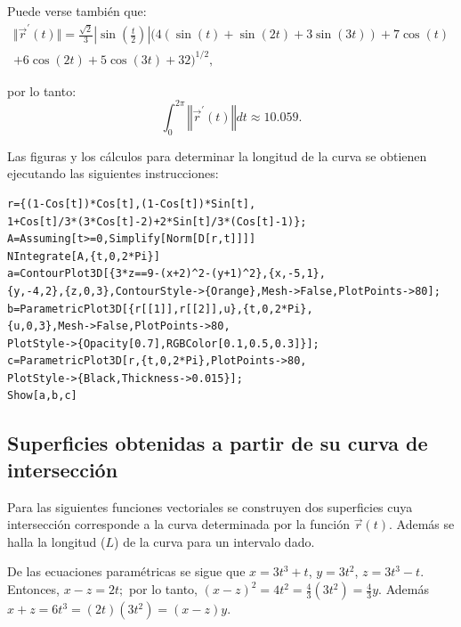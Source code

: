 Puede verse también que:
\begin{multline*}
\Vert \overrightarrow{r}^\prime(t)\Vert= \frac{\sqrt{2}}{3}\left|\sin\left(\frac{t}{2}\right)\right|\bigg(4(\sin(t)+\sin(2t)+3\sin(3t))+7\cos(t)\\ +6\cos(2t)+5\cos(3t)+32\bigg )^{1/2} ,
\end{multline*}

por lo tanto:
\[\int_0^{2\pi}\left\Vert \overrightarrow{r}^\prime(t)\right\Vert dt \approx 10.059.\]

Las figuras y los cálculos para determinar la longitud de la curva se obtienen ejecutando las siguientes instrucciones:

\begin{tcolorbox}[title=\bf Instrucción \verb"Mathematica"]\begin{Verbatim}[formatcom=\letraverbatim]
r={(1-Cos[t])*Cos[t],(1-Cos[t])*Sin[t],
1+Cos[t]/3*(3*Cos[t]-2)+2*Sin[t]/3*(Cos[t]-1)};
A=Assuming[t>=0,Simplify[Norm[D[r,t]]]]
NIntegrate[A,{t,0,2*Pi}]
a=ContourPlot3D[{3*z==9-(x+2)^2-(y+1)^2},{x,-5,1},
{y,-4,2},{z,0,3},ContourStyle->{Orange},Mesh->False,PlotPoints->80];
b=ParametricPlot3D[{r[[1]],r[[2]],u},{t,0,2*Pi},
{u,0,3},Mesh->False,PlotPoints->80,
PlotStyle->{Opacity[0.7],RGBColor[0.1,0.5,0.3]}];
c=ParametricPlot3D[r,{t,0,2*Pi},PlotPoints->80,
PlotStyle->{Black,Thickness->0.015}];
Show[a,b,c]
\end{Verbatim}
\end{tcolorbox}

\subsection{Superficies obtenidas a partir de su curva de intersección}

Para las siguientes funciones vectoriales se construyen dos superficies cuya intersección corresponde
a la curva determinada por la función $\overrightarrow{r}(t)$. Además se halla la longitud ($L$) de la curva para
un intervalo dado.

\begin{funciones}[series=ejercicios]
\item {}
\end{funciones}

De las ecuaciones paramétricas se sigue que
$x=3t^{3}+t$, $y=3t^{2}$, $z=3t^{3}-t$.
Entonces, $x-z=2t;$ por lo tanto, $\left( x-z\right) ^{2}=4t^{2}=\frac{4}{3}\left(
3t^{2}\right) =\frac{4}{3}y$. Además $x+z=6t^{3}=\left( 2t\right) \left( 3t^{2}\right) =\left(
x-z\right) y$.

